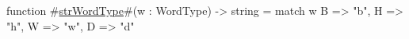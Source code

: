 function #\hyperref[sailMIPSzstrWordType]{strWordType}#(w : WordType) -> string = match w {
  B => "b",
  H => "h",
  W => "w",
  D => "d"
}
